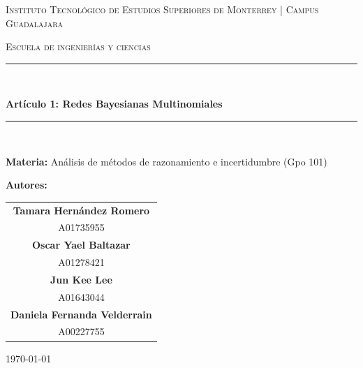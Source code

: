 \documentclass[12pt,a4paper]{article}
\begin{document}
\begin{titlepage}
    \centering
    
    {\scshape\Large Instituto Tecnológico de Estudios Superiores de Monterrey | Campus Guadalajara \par}
    \vspace{0.5cm}
    {\scshape\large Escuela de ingenierías y ciencias \par}
    
    \vfill
    \rule{\textwidth}{1pt} \\[0.4cm]
    {\huge\bfseries Artículo 1: Redes Bayesianas Multinomiales \par}
    \rule{\textwidth}{1pt} \\[0.4cm]
    \vfill
    
    {\Large\textbf{Materia:} Análisis de métodos de razonamiento e incertidumbre (Gpo 101) \par}
    \vspace{1.5cm}
    
    {\Large\textbf{Autores:}} \\[0.5cm]
    \begin{tabular}{c}
        \textbf{Tamara Hernández Romero} \\
        \small A01735955 \\[0.3cm]
        \textbf{Oscar Yael Baltazar} \\
        \small A01278421 \\[0.3cm]
        \textbf{Jun Kee Lee} \\
        \small A01643044 \\[0.3cm]
        \textbf{Daniela Fernanda Velderrain} \\
        \small A00227755
    \end{tabular}
    
    \vfill
    
    {\large \today \par} 
    
\end{titlepage}

\newpage
{} %
\tableofcontents
\newpage
\end{document}
